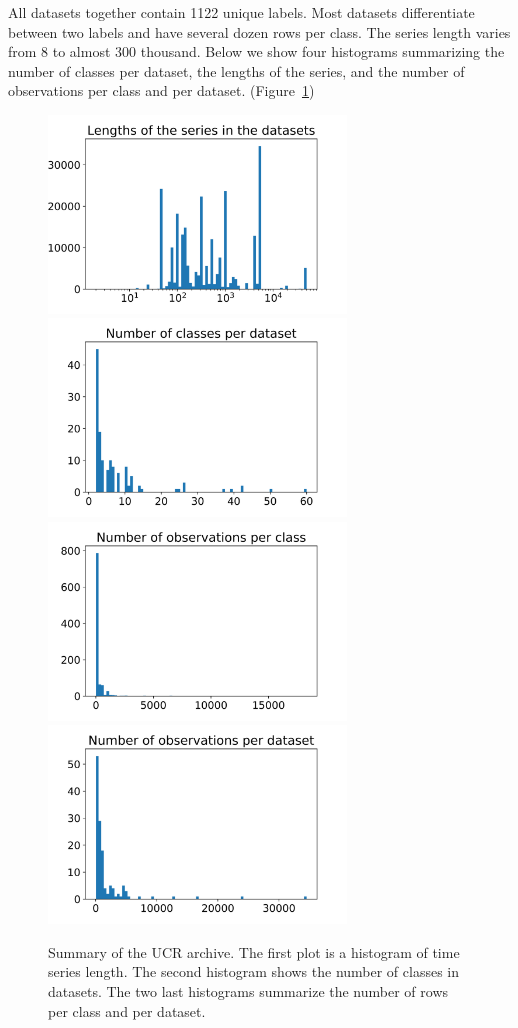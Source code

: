 \documentclass[a4paper,11pt,twoside]{report}
\theoremstyle{definition}
\begin{document}
All datasets together contain 1122 unique labels. Most datasets differentiate between two labels and have several dozen rows per class. The series length varies from 8 to almost 300 thousand. Below we show four histograms summarizing the number of classes per dataset, the lengths of the series, and the number of observations per class and per dataset. (Figure~\ref{fig:histograms})
\begin{figure}[h!]
\centering
\includegraphics[width=7.9cm]{imgs/lengths_of_the_series_in_the_datasets.png}
\includegraphics[width=7.9cm]{imgs/number_of_classes_per_dataset.png}
\includegraphics[width=7.9cm]{imgs/number_of_observations_per_class.png}
\includegraphics[width=7.9cm]{imgs/number_of_observations_per_dataset.png}
\caption{Summary of the UCR archive. The first plot is a histogram of time series length. The second histogram shows the number of classes in datasets. The two last histograms summarize the number of rows per class and per dataset.}
\label{fig:histograms}
\end{figure}
\end{document}
